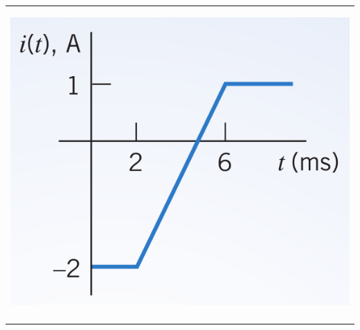 \documentclass[aspectratio=169]{beamer}
\begin{document}
\begin{frame}[fragile]
\begin{tabular}{r}
\begin{columns}
		  \begin{column}{.3\textwidth}  %
		    \begin{center}
    	  		\includegraphics[height=.7\textwidth]{figura10.png}	
		    \end{center}
		\end{column}
	
	
	
	\end{columns}\\
	

	
	
	 \begin{columns}
		\begin{column}{1\textwidth}
	\newline	\scalebox{0.8}{Answer: $L=40mH.$}
		\end{column}
	  \end{columns}\\
	
	
\end{tabular}
\end{frame}
\end{document}
